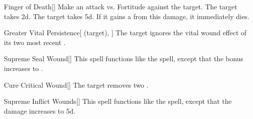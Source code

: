 \lowercase{\hypertarget{spell:Finger of Death}{}}\label{spell:Finger of Death}
\begin{freeability}[Rank 6]{\hypertarget{spell:Finger of Death}{Finger of Death}}[]
Make an attack vs. Fortitude against the target.
\hit The target takes  \plus2d.
\crit The target takes  \plus5d.
If it gains a  from this damage, it immediately dies.
\end{freeability}
\vspace{0.25em}



\lowercase{\hypertarget{spell:Greater Vital Persistence}{}}\label{spell:Greater Vital Persistence}
\begin{attuneability}[Rank 6]{\hypertarget{spell:Greater Vital Persistence}{Greater Vital Persistence}}[ (target), ]
The target ignores the vital wound effect of its two most recent .
\end{attuneability}
\vspace{0.25em}



\lowercase{\hypertarget{spell:Supreme Seal Wound}{}}\label{spell:Supreme Seal Wound}
\begin{freeability}[Rank 6]{\hypertarget{spell:Supreme Seal Wound}{Supreme Seal Wound}}[]
This spell functions like the  spell, except that the bonus increases to .
\end{freeability}
\vspace{0.25em}



\lowercase{\hypertarget{spell:Cure Critical Wound}{}}\label{spell:Cure Critical Wound}
\begin{apability}[Rank 7]{\hypertarget{spell:Cure Critical Wound}{Cure Critical Wound}}[]
The target removes two .
\end{apability}
\vspace{0.25em}



\lowercase{\hypertarget{spell:Supreme Inflict Wounds}{}}\label{spell:Supreme Inflict Wounds}
\begin{freeability}[Rank 8]{\hypertarget{spell:Supreme Inflict Wounds}{Supreme Inflict Wounds}}[]
This spell functions like the  spell, except that the damage increases to  \plus5d.
\end{freeability}
\vspace{0.25em}



